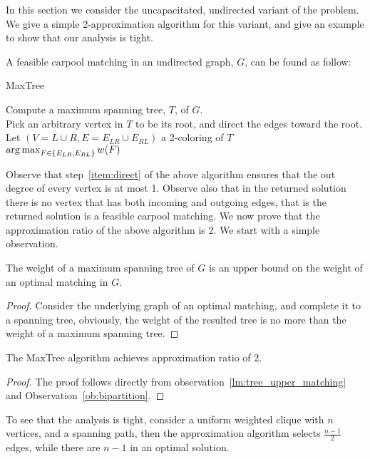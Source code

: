 \label{sec:ucudcm}
In this section we consider the uncapacitated, undirected variant of the problem. 
We give a simple 2-approximation algorithm for this variant, 
and give an example to show that our analysis is tight.

A feasible carpool matching in an undirected graph, $G$, can be found as follow:

\begin{algorithm}
\caption{MaxTree}
Compute a maximum spanning tree, $T$, of $G$.											\\
Pick an arbitrary vertex in $T$ to be its root, and direct the edges toward the root.	\\
\label{item:direct}
Let $(V = L \cup R, E = E_{LR} \cup E_{RL})$ a 2-coloring of $T$						\\
\Return $\operatorname*{arg\,max}_{F \in \{E_{LR}, E_{RL}\}} w(F)$
\end{algorithm}

Observe that step~\ref{item:direct} of the above algorithm ensures that 
the out degree of every vertex is at most 1.
Observe also that in the returned solution
there is no vertex that has both incoming and outgoing edges,
that is the returned solution is a feasible carpool matching.  
We now prove that the approximation ratio of the above algorithm is 2.
We start with a simple observation.

\begin{observation}
\label{lm:tree_upper_matching}
The weight of a maximum spanning tree of $G$ is an upper bound on the weight of
an optimal matching in $G$.
\end{observation}

\begin{proof}
Consider the underlying graph of an optimal matching, 
and complete it to a spanning tree, obviously, the
weight of the resulted tree is no more than the weight of a maximum spanning
tree.
\end{proof}

\begin{theorem}
The MaxTree algorithm achieves approximation ratio of 2.
\end{theorem}

\begin{proof}
The proof follows directly from 
observation~\ref{lm:tree_upper_matching} and Observation~\ref{ob:bipartition}.
\end{proof}

To see that the analysis is tight, 
consider a uniform weighted clique with $n$ vertices, 
and a spanning path, 
then the approximation algorithm selects $\frac{n - 1}{2}$ edges, 
while there are $n - 1$ in an optimal solution.  